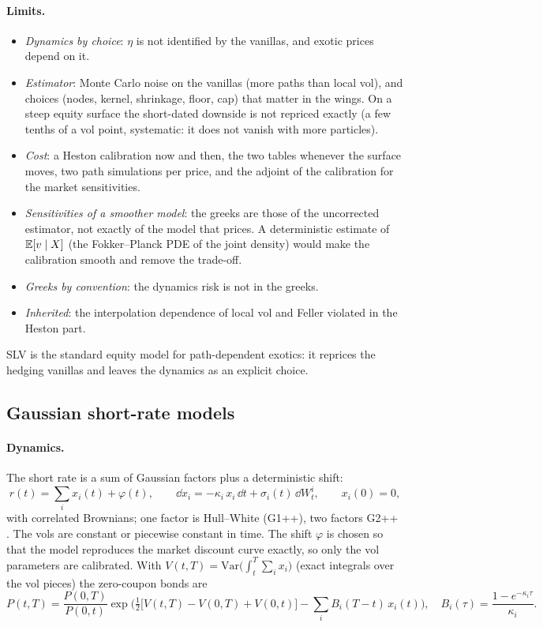 \paragraph{Limits.}
\begin{itemize}[nosep]
  \item \emph{Dynamics by choice}: $\eta$ is not identified by the vanillas, and exotic prices depend on it.
  \item \emph{Estimator}: Monte Carlo noise on the vanillas (more paths than local vol), and choices (nodes, kernel,
        shrinkage, floor, cap) that matter in the wings. On a steep equity surface the short-dated downside is not
        repriced exactly (a few tenths of a vol point, systematic: it does not vanish with more particles).
  \item \emph{Cost}: a Heston calibration now and then, the two tables whenever the surface moves, two path
        simulations per price, and the adjoint of the calibration for the market sensitivities.
  \item \emph{Sensitivities of a smoother model}: the greeks are those of the uncorrected estimator, not exactly of the
        model that prices. A deterministic estimate of $\mathbb{E}[v \mid X]$ (the Fokker--Planck PDE of the joint density) would
        make the calibration smooth and remove the trade-off.
  \item \emph{Greeks by convention}: the dynamics risk is not in the greeks.
  \item \emph{Inherited}: the interpolation dependence of local vol and Feller violated in the Heston part.
\end{itemize}
SLV is the standard equity model for path-dependent exotics: it reprices the hedging vanillas and leaves the dynamics
as an explicit choice.

\subsection{Gaussian short-rate models}\label{sec:mp-gsr}
\paragraph{Dynamics.} The short rate is a sum of Gaussian factors plus a deterministic shift:
\[
  r(t) = \sum_i x_i(t) + \varphi(t),\qquad \dd x_i = -\kappa_i\,x_i\,\dd t + \sigma_i(t)\,\dd W^i_t,\qquad x_i(0) = 0 ,
\]
with correlated Brownians; one factor is Hull--White \citep{hull1990} (G1++), two factors G2++ \citep[ch.~3--4]{brigo2006}.
The vols are constant or piecewise constant in time. The shift $\varphi$ is chosen so that the model reproduces the market
discount curve exactly, so only the vol parameters are calibrated. With $V(t,T) = \mathrm{Var}\big(\int_t^T \sum_i x_i\big)$ (exact
integrals over the vol pieces) the zero-coupon bonds are
\[
  P(t,T) = \frac{P(0,T)}{P(0,t)}\exp\Big(\tfrac12\big[V(t,T) - V(0,T) + V(0,t)\big] - \sum_i B_i(T-t)\,x_i(t)\Big),\quad
  B_i(\tau) = \frac{1 - e^{-\kappa_i\tau}}{\kappa_i}.
\]

